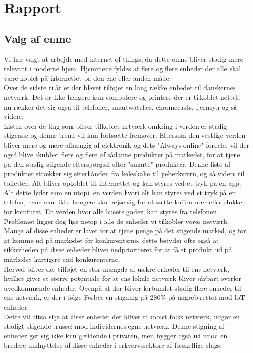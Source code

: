 
\chapter{Rapport}

\section{Valg af emne}
Vi har valgt at arbejde med internet of things, da dette emne bliver stadig mere relevant i moderne hjem. Hjemmene fyldes af flere og flere enheder der alle skal være koblet på internettet på den ene eller anden måde.\\
Over de sidste ti år er der blevet tilføjet en lang række enheder til danskernes netværk. Det er ikke længere kun computere og printere der er tilkoblet nettet, nu rækker det sig også til telefoner, smartwatches, chromecasts, fjernsyn og så videre. \\
Listen over de ting som bliver tilkoblet netværk omkring i verden er stadig stigende og denne trend vil kun fortsætte fremover. Eftersom den vestlige verden bliver mere og mere afhængig af elektronik og dets "Always online" fordele, vil der også blive skubbet flere og flere af sådanne produkter på markedet, for at tjene på den stadig stigende efterspørgsel efter "smarte" produkter. Denne liste af produkter strækker sig efterhånden fra køleskabe til peberkværn, og så videre til toiletter. Alt bliver opkoblet til internettet og kan styres ved et tryk på en app. Alt dette lyder som en utopi, en verden hvori alt kan styres ved et tryk på en telefon, hvor man ikke længere skal rejse sig for at sætte kaffen over eller slukke for komfuret. En verden hvor alle husets goder, kan styres fra telefonen.\\
Problemet ligger dog lige netop i alle de enheder vi tilkobler vores netværk. Mange af disse enheder er lavet for at tjene penge på det stigende marked, og for at komme ud på markedet før konkurenterne, dette betyder ofte også at sikkerheden på disse enheder bliver nedprioriteret for at få et produkt ud på markedet hurtigere end konkurenterne.\\
Herved bliver der tilføjet en stor mængde af usikre enheder til ens netværk, hvilket giver et større potentiale for at ens lokale netværk bliver sårbart overfor uvedkommende enheder. Ovenpå at der bliver forbundet stadig flere enheder til ens netværk, er der i følge Forbes en stigning på 280\% på angreb rettet mod IoT enheder.\cite{website:Forbes2018} \\
Dette vil altså sige at disse enheder der bliver tilkoblet folks netværk, udgør en stadigt stigende trussel mod individernes egne netværk. Denne stigning af enheder gør sig ikke kun gældende i privaten, men bygger også ud imod en bredere undnyttelse af disse enheder i erhvervssektore af forskellige slags. \\

